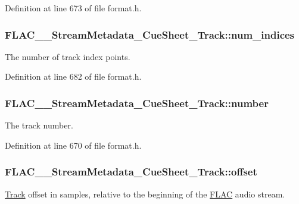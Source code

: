 Definition at line 673 of file format.\+h.

\subsubsection[{\texorpdfstring{num\+\_\+indices}{num_indices}}]{ F\+L\+A\+C\+\_\+\+\_\+\+Stream\+Metadata\+\_\+\+Cue\+Sheet\+\_\+\+Track\+::num\+\_\+indices}\hypertarget{struct_f_l_a_c_____stream_metadata___cue_sheet___track_a5f1c1d7e3ddc533938b83951c7b3dda5}{}\label{struct_f_l_a_c_____stream_metadata___cue_sheet___track_a5f1c1d7e3ddc533938b83951c7b3dda5}
The number of track index points. 

Definition at line 682 of file format.\+h.

\subsubsection[{\texorpdfstring{number}{number}}]{ F\+L\+A\+C\+\_\+\+\_\+\+Stream\+Metadata\+\_\+\+Cue\+Sheet\+\_\+\+Track\+::number}\hypertarget{struct_f_l_a_c_____stream_metadata___cue_sheet___track_a429103d63c44d1861b4dc0762726701a}{}\label{struct_f_l_a_c_____stream_metadata___cue_sheet___track_a429103d63c44d1861b4dc0762726701a}
The track number. 

Definition at line 670 of file format.\+h.

\subsubsection[{\texorpdfstring{offset}{offset}}]{ F\+L\+A\+C\+\_\+\+\_\+\+Stream\+Metadata\+\_\+\+Cue\+Sheet\+\_\+\+Track\+::offset}\hypertarget{struct_f_l_a_c_____stream_metadata___cue_sheet___track_a40e1c888253a56b6dc4885a44138d1bf}{}\label{struct_f_l_a_c_____stream_metadata___cue_sheet___track_a40e1c888253a56b6dc4885a44138d1bf}
\hyperlink{class_track}{Track} offset in samples, relative to the beginning of the \hyperlink{namespace_f_l_a_c}{F\+L\+AC} audio stream. 

